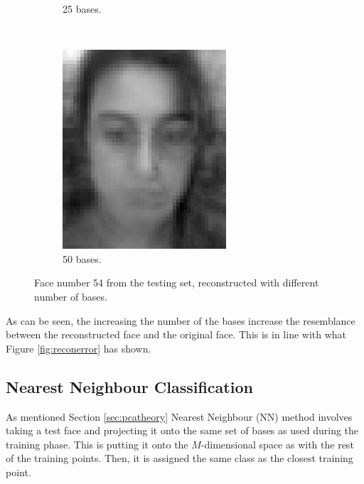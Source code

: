 \documentclass[a4paper, 10pt, conference]{ieeeconf}
\begin{document}
\begin{figure}[!ht]
\begin{subfigure}{0.1\textwidth}
          \caption{25 bases.}
        \end{subfigure}
        ~
        \begin{subfigure}{0.1\textwidth}
          \includegraphics[width=\textwidth]{src/reface33.png}
          \caption{50 bases.}
        \end{subfigure}

	\caption{Face number 54 from the testing set, reconstructed with different number of bases.}
  \label{fig:reconex3}
\end{figure}

As can be seen, the increasing the number of the bases increase the resemblance between the reconstructed face and the original face. This is in line with what Figure \ref{fig:reconerror} has shown.

\subsection{Nearest Neighbour Classification}
As mentioned Section \ref{sec:pcatheory} Nearest Neighbour (NN) method involves taking a test face and projecting it onto the same set of bases as used during the training phase. This is putting it onto the $M$-dimensional space as with the rest of the training points. Then, it is assigned the same class as the closest training point.
\end{document}
